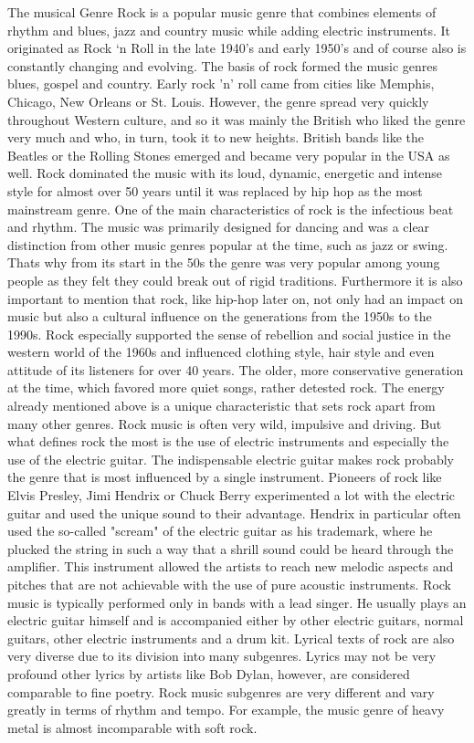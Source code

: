 The musical Genre Rock is a popular music genre that combines elements of rhythm and blues,
jazz and country music while adding electric instruments.
It originated as Rock `n Roll in the late 1940's and early 1950's and of course also is constantly
changing and evolving.
The basis of rock formed the music genres blues, gospel and country.
Early rock 'n' roll came from cities like Memphis, Chicago, New Orleans or St. Louis.
However, the genre spread very quickly throughout Western culture, and so it was mainly
the British who liked the genre very much and who, in turn, took it to new heights.\cite{2021MasterclassRock}
British bands like the Beatles or the Rolling Stones emerged and became very popular in the USA as well.
Rock dominated the music with its loud, dynamic, energetic and intense style for almost over
50 years until it was replaced by hip hop as the most mainstream genre.
One of the main characteristics of rock is the infectious beat and rhythm.
The music was primarily designed for dancing and was a clear distinction from other music genres
popular at the time, such as jazz or swing.
Thats why from its start in the 50s the genre was very popular among young people as they felt
they could break out of rigid traditions.
Furthermore it is also important to mention that rock, like hip-hop later on,
not only had an impact on music but also a cultural influence on the generations
from the 1950s to the 1990s.\cite{2021MasterclassRock} Rock especially supported the sense of rebellion and social
justice in the western world of the 1960s and influenced clothing style,
hair style and even attitude of its listeners for over 40 years.
The older, more conservative generation at the time, which favored more quiet songs,
rather detested rock.
The energy already mentioned above is a unique characteristic that sets rock apart
from many other genres. Rock music is often very wild, impulsive and driving.
But what defines rock the most is the use of electric instruments and especially
the use of the electric guitar.\cite{MusicalDictRock}
The indispensable electric guitar makes rock probably the genre that is most
influenced by a single instrument. Pioneers of rock like Elvis Presley,
Jimi Hendrix or Chuck Berry experimented a lot with the electric guitar
and used the unique sound to their advantage.
Hendrix in particular often used the so-called "scream" of the electric guitar as his trademark,
where he plucked the string in such a way that a shrill sound could be heard through the amplifier.
This instrument allowed the artists to reach new melodic aspects and pitches that are not achievable
with the use of pure acoustic instruments.\cite{MusicalDictRock} Rock music is typically performed only in bands with a lead singer.
He usually plays an electric guitar himself and is accompanied either by other electric guitars,
normal guitars, other electric instruments and a drum kit.
Lyrical texts of rock are also very diverse due to its division into many subgenres.
Lyrics may not be very profound other lyrics by artists like Bob Dylan, however,
are considered comparable to fine poetry.
Rock music subgenres are very different and vary greatly in terms of rhythm and tempo.
For example, the music genre of heavy metal is almost incomparable with soft rock.\cite{Clark2021}